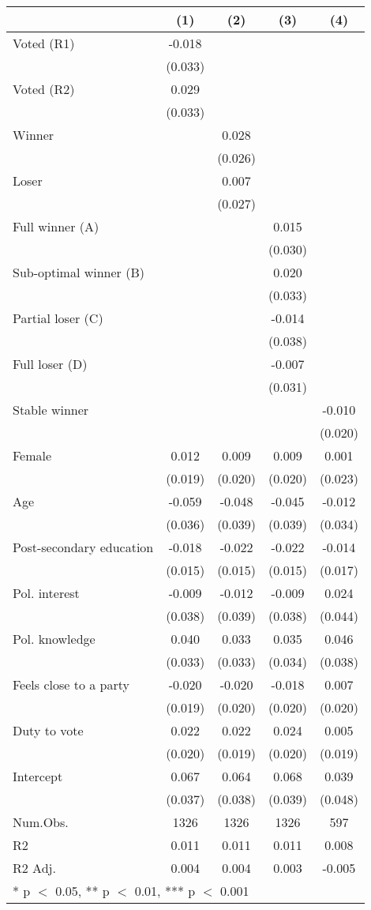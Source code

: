\begin{tabular}[t]{lcccc}
\toprule
  & (1) & (2) & (3) & (4)\\
\midrule
Voted (R1) & -0.018 &  &  & \\
 & (0.033) &  &  \vphantom{1} & \\
Voted (R2) & 0.029 &  &  & \\
 & (0.033) &  &  & \\
Winner &  & 0.028 &  & \\
 &  & (0.026) &  & \\
Loser &  & 0.007 &  & \\
 &  & (0.027) &  & \\
Full winner (A) &  &  & 0.015 & \\
 &  &  & (0.030) & \\
Sub-optimal winner (B) &  &  & 0.020 & \\
 &  &  & (0.033) & \\
Partial loser (C) &  &  & -0.014 & \\
 &  &  & (0.038) & \\
Full loser (D) &  &  & -0.007 & \\
 &  &  & (0.031) & \\
Stable winner &  &  &  & -0.010\\
 &  &  &  & (0.020)\\
Female & 0.012 & 0.009 & 0.009 & 0.001\\
 & (0.019) & (0.020) & (0.020) & (0.023)\\
Age & -0.059 & -0.048 & -0.045 & -0.012\\
 & (0.036) & (0.039) & (0.039) & (0.034)\\
Post-secondary education & -0.018 & -0.022 & -0.022 & -0.014\\
 & (0.015) & (0.015) & (0.015) & (0.017)\\
Pol. interest & -0.009 & -0.012 & -0.009 & 0.024\\
 & (0.038) & (0.039) & (0.038) & (0.044)\\
Pol. knowledge & 0.040 & 0.033 & 0.035 & 0.046\\
 & (0.033) & (0.033) & (0.034) & (0.038)\\
Feels close to a party & -0.020 & -0.020 & -0.018 & 0.007\\
 & (0.019) & (0.020) & (0.020) & (0.020)\\
Duty to vote & 0.022 & 0.022 & 0.024 & 0.005\\
 & (0.020) & (0.019) & (0.020) & (0.019)\\
Intercept & 0.067 & 0.064 & 0.068 & 0.039\\
 & (0.037) & (0.038) & (0.039) & (0.048)\\
\midrule
Num.Obs. & 1326 & 1326 & 1326 & 597\\
R2 & 0.011 & 0.011 & 0.011 & 0.008\\
R2 Adj. & 0.004 & 0.004 & 0.003 & -0.005\\
\bottomrule
\multicolumn{5}{l}{\rule{0pt}{1em}* p $<$ 0.05, ** p $<$ 0.01, *** p $<$ 0.001}\\
\end{tabular}
